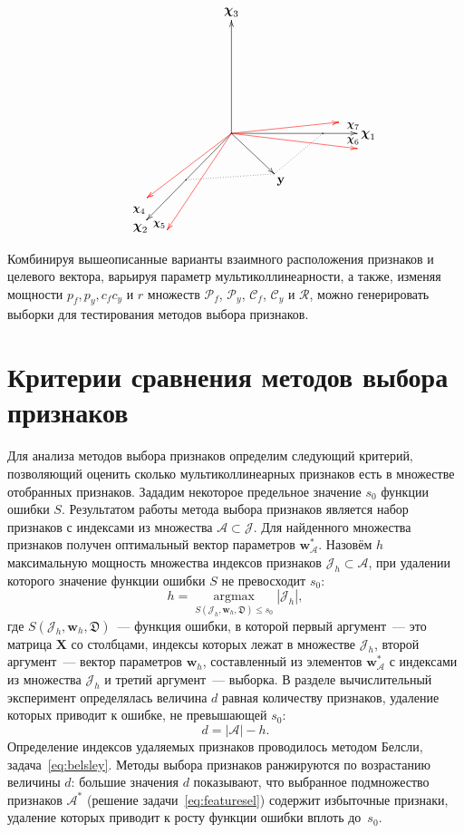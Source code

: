 \documentclass[a4paper,12pt]{article}
\newcommand{\bw}{\mathbf{w}}
\newcommand{\by}{\mathbf{y}}
\newcommand{\bX}{\mathbf{X}}
\newcommand{\bchi}{\boldsymbol{\chi}}
\newcommand{\calC}{\mathcal{C}}
\newcommand{\calP}{\mathcal{P}}
\newcommand{\calR}{\mathcal{R}}
\newcommand{\calJ}{\mathcal{J}}
\newcommand{\calA}{\mathcal{A}}
\newcommand{\frakD}{\mathfrak{D}}
\begin{document}
\begin{enumerate}
\begin{figure}[!h]
\begin{equation*}
\xymatrix{
& & & \bchi_3 & & & \\
& & &     & & & \\
& & &     & & & \\
& & & *=0{.}\ar[uuu] %
\ar[rrr]_>>{\large \bchi_6}^>>{\large \bchi_7} %
\ar[lldd]_>>{\large \bchi_4}^>>{\large \bchi_5} %
\ar@[red][rrr]!/va(160) 25pt/ %
\ar@[red][rrr]!/va(-90) 13pt/ %
\ar@[red][ddl]+/va(190) 15pt/ %
\ar[rd]
\ar@[red][lld]+/va(-70) 15pt/ & & *={.}\ar@{.}[dl]+/va(140) 7pt/ & \bchi_1 \\
& & *={.}\ar@{.}[rr]!/va(90) 5pt/ & & \by & & \\
& \bchi_2 & & & &  
}
\end{equation*}
\caption{}
\label{fig:sumort}
\end{figure}
\end{enumerate}

Комбинируя вышеописанные варианты взаимного расположения признаков и целевого вектора, варьируя параметр мультиколлинеарности, а также, изменяя мощности $p_f, p_y, c_f c_y$ и $r$ множеств $\calP_f$, $\calP_y$, $\calC_f$, $\calC_y$ и $\calR$, можно генерировать выборки для тестирования методов выбора признаков. 

\section{Критерии сравнения методов выбора признаков}

Для анализа методов выбора признаков определим следующий критерий, позволяющий оценить сколько мультиколлинеарных признаков есть в множестве отобранных признаков. Зададим некоторое предельное значение $s_0$ функции ошибки $S$. Результатом работы метода выбора признаков является набор признаков с индексами из множества $\calA \subset \calJ$. Для найденного множества признаков получен оптимальный вектор параметров $\bw^*_{\calA}$. Назовём $ h $ максимальную мощность множества индексов признаков $\calJ_h \subset \calA $, при удалении которого значение функции ошибки $S$ не превосходит $s_0$:
\begin{equation}
h = \mathop{\arg\max}\limits_{S(\calJ_h, \bw_h, \frakD) \leq s_0} |\calJ_h|,
\label{eq:crit}
\end{equation}
где $S(\calJ_h, \bw_h, \frakD)$~--- функция ошибки, в которой первый аргумент~--- это матрица $\bX$ со столбцами, индексы которых лежат в множестве $\calJ_h$, второй аргумент~--- вектор параметров $\bw_h$, составленный из элементов $\bw^*_{\calA}$ с индексами из множества $\calJ_h$ и третий аргумент~--- выборка. В разделе вычислительный эксперимент определялась величина $d$ равная количеству признаков, удаление которых приводит к ошибке, не превышающей $s_0$:
\[
d = |\calA| - h.
\] 
Определение индексов удаляемых признаков  проводилось методом Белсли, задача~\eqref{eq:belsley}. 
Методы выбора признаков ранжируются по возрастанию величины $d$: большие значения $d$ показывают, что выбранное подмножество признаков $\calA^*$ (решение задачи~\eqref{eq:featuresel}) содержит избыточные признаки, удаление которых приводит к росту функции ошибки вплоть до~$s_0$. 
\end{document}
